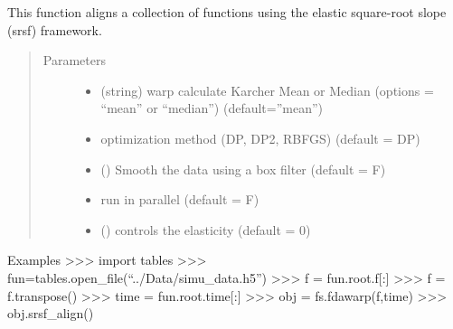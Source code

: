\documentclass[letterpaper,10pt,english]{sphinxmanual}
\begin{document}
\begin{fulllineitems}
\begin{fulllineitems}
\label{\detokenize{time_warping:time_warping.fdawarp.srsf_align}}
This function aligns a collection of functions using the elastic
square-root slope (srsf) framework.
\begin{quote}\begin{description}
\item[{Parameters}] \leavevmode\begin{itemize}
\item {} 
 \textendash{} (string) warp calculate Karcher Mean or Median (options = “mean” or “median”) (default=”mean”)

\item {} 
 \textendash{} optimization method (DP, DP2, RBFGS) (default = DP)

\item {} 
 () \textendash{} Smooth the data using a box filter (default = F)

\item {} 
 \textendash{} run in parallel (default = F)

\item {} 
 () \textendash{} controls the elasticity (default = 0)

\end{itemize}

\end{description}\end{quote}

Examples
\textgreater{}\textgreater{}\textgreater{} import tables
\textgreater{}\textgreater{}\textgreater{} fun=tables.open\_file(“../Data/simu\_data.h5”)
\textgreater{}\textgreater{}\textgreater{} f = fun.root.f{[}:{]}
\textgreater{}\textgreater{}\textgreater{} f = f.transpose()
\textgreater{}\textgreater{}\textgreater{} time = fun.root.time{[}:{]}
\textgreater{}\textgreater{}\textgreater{} obj = fs.fdawarp(f,time)
\textgreater{}\textgreater{}\textgreater{} obj.srsf\_align()

\end{fulllineitems}


\end{fulllineitems}
\end{document}
